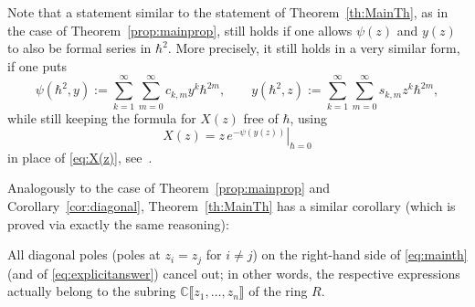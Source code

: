 \begin{remark} \label{rem:Hdeformed}
Note that a statement similar to the statement of Theorem~\ref{th:MainTh}, as in the case of Theorem~\ref{prop:mainprop}, still holds if one allows $\psi(z)$ and $y(z)$ to also be formal series in $\hbar^2$. More precisely, it still holds in a very similar form, if one puts
\[
\psi(\hbar^2,y):=\sum_{k=1}^\infty\sum_{m=0}^\infty c_{k,m} y^k\hbar^{2m},\qquad
y(\hbar^2,z):=\sum_{k=1}^\infty\sum_{m=0}^\infty s_{k,m} z^k\hbar^{2m},
\]
while still keeping the formula for $X(z)$ free of $\hbar$, \ie using
\begin{equation*}
X(z)=\left.z\,e^{-\psi(y(z))}\right|_{\hbar=0}
\end{equation*}
in place of \eqref{eq:X(z)}, see~\cite[\S 3]{BDKS21toprec}.
\end{remark}

Analogously to the case of Theorem~\ref{prop:mainprop} and Corollary~\ref{cor:diagonal}, Theorem~\ref{th:MainTh} has a similar corollary (which is proved via exactly the same reasoning):
\begin{corollary}\label{cor:Hdiag}
All diagonal poles (\ie poles at $z_i=z_j$ for $i\neq j$) on the right-hand side of \eqref{eq:mainth} (and of \eqref{eq:explicitanswer}) cancel out; in other words, the respec\-tive expressions actually belong to the subring $\mathbb{C}\llbracket z_1,\dots,z_n\rrbracket $ of the ring $R$.
\end{corollary}

